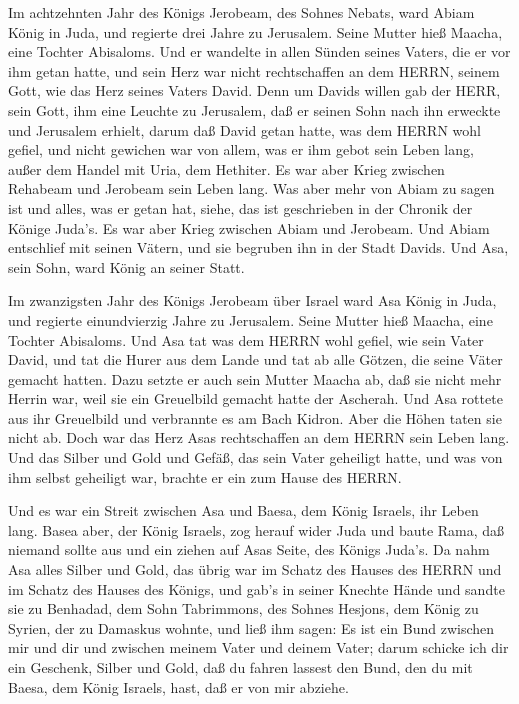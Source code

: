  Im achtzehnten Jahr des Königs Jerobeam, des Sohnes Nebats,
ward Abiam König in Juda,  und regierte drei Jahre zu
Jerusalem. Seine Mutter hieß Maacha, eine Tochter Abisaloms.
 Und er wandelte in allen Sünden seines Vaters, die er vor
ihm getan hatte, und sein Herz war nicht rechtschaffen an dem HERRN,
seinem Gott, wie das Herz seines Vaters David.  Denn um
Davids willen gab der HERR, sein Gott, ihm eine Leuchte zu Jerusalem,
daß er seinen Sohn nach ihn erweckte und Jerusalem erhielt, 
darum daß David getan hatte, was dem HERRN wohl gefiel, und nicht
gewichen war von allem, was er ihm gebot sein Leben lang, außer dem
Handel mit Uria, dem Hethiter.  Es war aber Krieg zwischen
Rehabeam und Jerobeam sein Leben lang.  Was aber mehr von
Abiam zu sagen ist und alles, was er getan hat, siehe, das ist
geschrieben in der Chronik der Könige Juda's. Es war aber Krieg zwischen
Abiam und Jerobeam.  Und Abiam entschlief mit seinen Vätern,
und sie begruben ihn in der Stadt Davids. Und Asa, sein Sohn, ward König
an seiner Statt.

 Im zwanzigsten Jahr des Königs Jerobeam über Israel ward
Asa König in Juda,  und regierte einundvierzig Jahre zu
Jerusalem. Seine Mutter hieß Maacha, eine Tochter Abisaloms.
 Und Asa tat was dem HERRN wohl gefiel, wie sein Vater
David,  und tat die Hurer aus dem Lande und tat ab alle
Götzen, die seine Väter gemacht hatten.  Dazu setzte er
auch sein Mutter Maacha ab, daß sie nicht mehr Herrin war, weil sie ein
Greuelbild gemacht hatte der Ascherah. Und Asa rottete aus ihr
Greuelbild und verbrannte es am Bach Kidron.  Aber die
Höhen taten sie nicht ab. Doch war das Herz Asas rechtschaffen an dem
HERRN sein Leben lang.  Und das Silber und Gold und Gefäß,
das sein Vater geheiligt hatte, und was von ihm selbst geheiligt war,
brachte er ein zum Hause des HERRN.

 Und es war ein Streit zwischen Asa und Baesa, dem König
Israels, ihr Leben lang.  Basea aber, der König Israels,
zog herauf wider Juda und baute Rama, daß niemand sollte aus und ein
ziehen auf Asas Seite, des Königs Juda's.  Da nahm Asa
alles Silber und Gold, das übrig war im Schatz des Hauses des HERRN und
im Schatz des Hauses des Königs, und gab's in seiner Knechte Hände und
sandte sie zu Benhadad, dem Sohn Tabrimmons, des Sohnes Hesjons, dem
König zu Syrien, der zu Damaskus wohnte, und ließ ihm sagen:
 Es ist ein Bund zwischen mir und dir und zwischen meinem
Vater und deinem Vater; darum schicke ich dir ein Geschenk, Silber und
Gold, daß du fahren lassest den Bund, den du mit Baesa, dem König
Israels, hast, daß er von mir abziehe.

